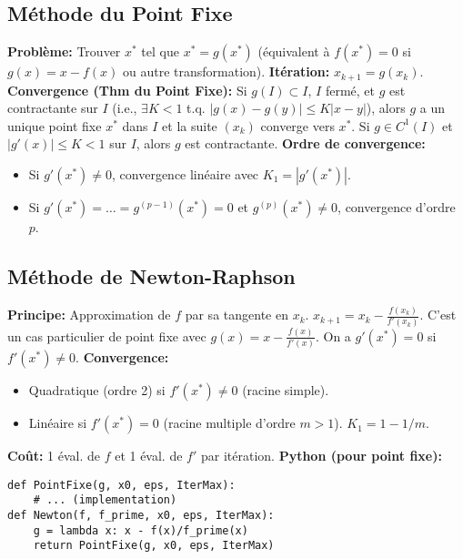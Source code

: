 \documentclass[10pt,a4paper]{article}
\begin{document}
\subsection*{Méthode du Point Fixe}
\textbf{Problème:} Trouver $x^*$ tel que $x^* = g(x^*)$ (équivalent à $f(x^*)=0$ si $g(x)=x-f(x)$ ou autre transformation).
\textbf{Itération:} $x_{k+1} = g(x_k)$.
\textbf{Convergence (Thm du Point Fixe):} Si $g(I) \subset I$, $I$ fermé, et $g$ est contractante sur $I$ (i.e., $\exists K<1$ t.q. $|g(x)-g(y)| \le K|x-y|$), alors $g$ a un unique point fixe $x^*$ dans $I$ et la suite $(x_k)$ converge vers $x^*$.
Si $g \in C^1(I)$ et $|g'(x)| \le K < 1$ sur $I$, alors $g$ est contractante.
\textbf{Ordre de convergence:}
\begin{itemize}
    \item Si $g'(x^*) \neq 0$, convergence linéaire avec $K_1 = |g'(x^*)|$.
    \item Si $g'(x^*) = \dots = g^{(p-1)}(x^*) = 0$ et $g^{(p)}(x^*) \neq 0$, convergence d'ordre $p$.
\end{itemize}

\subsection*{Méthode de Newton-Raphson}
\textbf{Principe:} Approximation de $f$ par sa tangente en $x_k$.
$x_{k+1} = x_k - \frac{f(x_k)}{f'(x_k)}$.
C'est un cas particulier de point fixe avec $g(x) = x - \frac{f(x)}{f'(x)}$.
On a $g'(x^*) = 0$ si $f'(x^*) \neq 0$.
\textbf{Convergence:}
\begin{itemize}
    \item Quadratique (ordre 2) si $f'(x^*) \neq 0$ (racine simple).
    \item Linéaire si $f'(x^*)=0$ (racine multiple d'ordre $m > 1$). $K_1 = 1 - 1/m$.
\end{itemize}
\textbf{Coût:} 1 éval. de $f$ et 1 éval. de $f'$ par itération.
\textbf{Python (pour point fixe):}
\begin{verbatim}
def PointFixe(g, x0, eps, IterMax):
    # ... (implementation)
def Newton(f, f_prime, x0, eps, IterMax):
    g = lambda x: x - f(x)/f_prime(x)
    return PointFixe(g, x0, eps, IterMax)
\end{verbatim}
\end{document}
